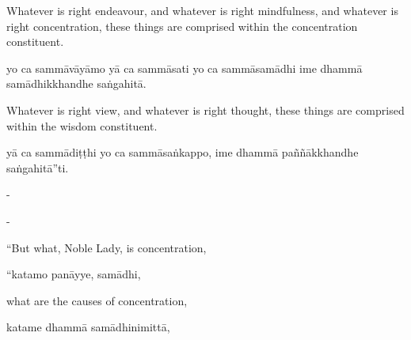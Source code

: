 \begin{samepage}
\begin{leftcolumn*}
Whatever is right endeavour, and whatever is right mindfulness, and whatever is right concentration, these things are comprised within the concentration constituent.
\end{leftcolumn*}

\begin{rightcolumn}
yo ca sammāvāyāmo yā ca sammāsati yo ca sammāsamādhi ime dhammā samādhikkhandhe saṅgahitā.
\end{rightcolumn}
\end{samepage}

\begin{samepage}
\begin{leftcolumn*}
Whatever is right view, and whatever is right thought, these things are comprised within the wisdom constituent.
\end{leftcolumn*}

\begin{rightcolumn}
yā ca sammādiṭṭhi yo ca sammāsaṅkappo, ime dhammā paññākkhandhe saṅgahitā”ti.
\end{rightcolumn}
\end{samepage}

\begin{samepage}
\begin{leftcolumn*}
-
\end{leftcolumn*}

\begin{rightcolumn}
-
\end{rightcolumn}
\end{samepage}

\begin{samepage}
\begin{leftcolumn*}
“But what, Noble Lady, is concentration,
\end{leftcolumn*}

\begin{rightcolumn}
“katamo panāyye, samādhi,
\end{rightcolumn}
\end{samepage}

\begin{samepage}
\begin{leftcolumn*}
what are the causes of concentration,
\end{leftcolumn*}

\begin{rightcolumn}
katame dhammā samādhinimittā,
\end{rightcolumn}
\end{samepage}

